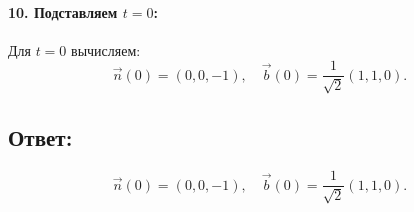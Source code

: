 \documentclass{article}
\begin{document}
        \paragraph{10. Подставляем \(t = 0\):}
        Для \(t = 0\) вычисляем:
        \[
        \vec{n}(0) = (0, 0, -1), \quad
        \vec{b}(0) = \frac{1}{\sqrt{2}}(1, 1, 0).
        \]
        
        \subsection*{Ответ:}
        \[
        \vec{n}(0) = (0, 0, -1), \quad
        \vec{b}(0) = \frac{1}{\sqrt{2}}(1, 1, 0).
        \]

                    
        
       
                              
                
\end{document}
